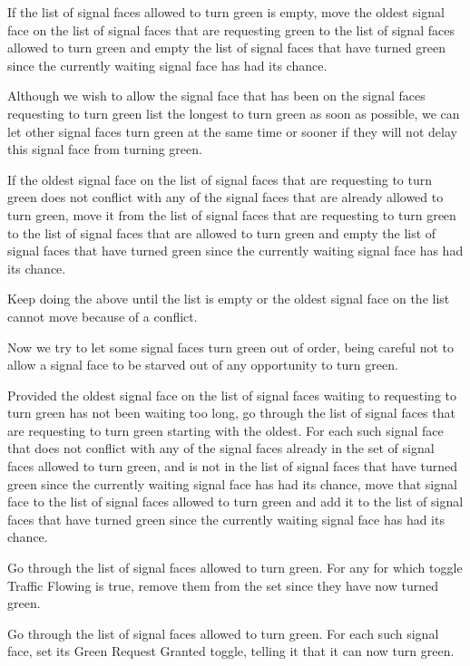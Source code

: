 \documentclass[letterpaper,twoside]{article}
\begin{document}
If the list of signal faces allowed to turn green is empty, move the
oldest signal face on the list of signal faces that are requesting
green to the list of signal faces allowed to turn green and empty the list
of signal faces that have turned green since the currently waiting
signal face has had its chance.

Although we wish to allow the signal face that has been on the
signal faces requesting to turn green list the longest to turn green
as soon as possible, we can let other signal faces turn green
at the same time or sooner if they will not delay this signal face
from turning green.

If the oldest signal face on the list of signal faces that are
requesting to turn green does not conflict with any of the signal
faces that are already allowed to turn green, move it from the
list of signal faces that are requesting to turn green to the list
of signal faces that are allowed to turn green and empty the list
of signal faces that have turned green since the currently waiting
signal face has had its chance.

Keep doing the above until the list is empty or the oldest signal
face on the list cannot move because of a conflict.

Now we try to let some signal faces turn green out of order, being
careful not to allow a signal face to be starved out of any
opportunity to turn green.

Provided the oldest signal face on the list of signal faces
waiting to requesting to turn green has not been waiting too long,
go through the list of signal faces that are requesting to turn green
starting with the oldest.  For each such signal face that does not
conflict with any of the signal faces already in the set of signal
faces allowed to turn green, and is not in the list of signal faces
that have turned green since the currently waiting signal face has
had its chance, move that signal face to the list of signal faces
allowed to turn green and add it to the list of signal faces that have
turned green since the currently waiting signal face has had its
chance.

Go through the list of signal faces allowed to turn green.  For any
for which toggle Traffic Flowing is true, remove them from the set
since they have now turned green.

Go through the list of signal faces allowed to turn green.  For each
such signal face, set its Green Request Granted toggle, telling it
that it can now turn green.
\end{document}
